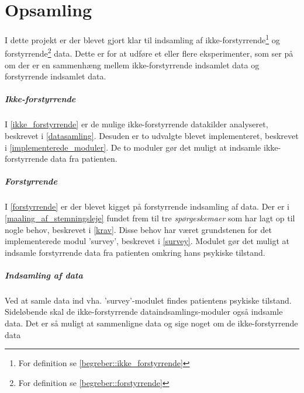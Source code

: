 \chapter{Opsamling}
I dette projekt er der blevet gjort klar til indsamling af ikke-forstyrrende\footnote{For definition se \cref{begreber::ikke_forstyrrende}} og forstyrrende\footnote{For definition se \cref{begreber::forstyrrende}} data. 
Dette er for at udføre et eller flere eksperimenter, som ser på om der er en sammenhæng mellem ikke-forstyrrende indsamlet data og forstyrrende indsamlet data.

\paragraph{Ikke-forstyrrende}
I \cref{ikke_forstyrrende} er de mulige ikke-forstyrrende datakilder analyseret, beskrevet i \cref{datasamling}.
Desuden er to udvalgte blevet implementeret, beskrevet i \cref{implementerede_moduler}.
De to moduler gør det muligt at indsamle ikke-forstyrrende data fra patienten.

\paragraph{Forstyrrende}
I \cref{forstyrrende} er der blevet kigget på forstyrrende indsamling af data.
Der er i \cref{maaling_af_stemningsleje} fundet frem til tre \textit{spørgeskemaer} som har lagt op til nogle behov, beskrevet i \cref{krav}.
Disse behov har været grundstenen for det implementerede modul 'survey', beskrevet i \cref{survey}.
Modulet gør det muligt at indsamle forstyrrende data fra patienten omkring hans psykiske tilstand.

\paragraph{Indsamling af data}
Ved at samle data ind vha. 'survey'-modulet findes patientens psykiske tilstand.
Sideløbende skal de ikke-forstyrrende dataindsamlings-moduler også indsamle data.
Det er så muligt at sammenligne data og sige noget om de ikke-forstyrrende data


